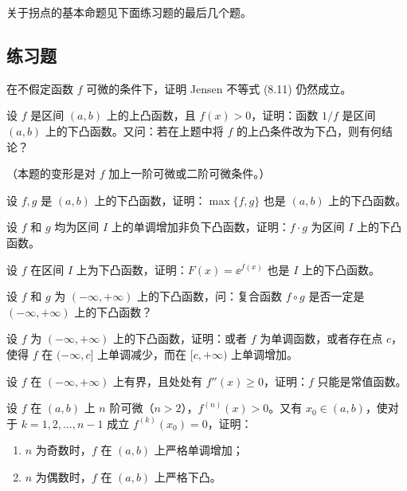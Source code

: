 关于拐点的基本命题见下面练习题的最后几个题。

\subsection{练习题}

\begin{xexercise}[1]
在不假定函数 $f$ 可微的条件下，证明 Jensen 不等式 (8.11) 仍然成立。
\end{xexercise}

\begin{xexercise}[2]
设 $f$ 是区间 $(a,b)$ 上的上凸函数，且 $f(x)>0$，证明：函数 $1/f$ 是区间 $(a,b)$ 上的下凸函数。又问：若在上题中将 $f$ 的上凸条件改为下凸，则有何结论？

  （本题的变形是对 $f$ 加上一阶可微或二阶可微条件。）
\end{xexercise}

\begin{xexercise}[3]
设 $f,g$ 是 $(a,b)$ 上的下凸函数，证明：$\max\{f,g\}$ 也是 $(a,b)$ 上的下凸函数。
\end{xexercise}

\begin{xexercise}[4]
设 $f$ 和 $g$ 均为区间 $I$ 上的单调增加非负下凸函数，证明：$f\cdot g$ 为区间 $I$ 上的下凸函数。
\end{xexercise}

\begin{xexercise}[5]
设 $f$ 在区间 $I$ 上为下凸函数，证明：$F(x)=\ee^{f(x)}$ 也是 $I$ 上的下凸函数。
\end{xexercise}

\begin{xexercise}[6]
设 $f$ 和 $g$ 为 $(-\infty,+\infty)$ 上的下凸函数，问：复合函数 $f\circ g$ 是否一定是 $(-\infty,+\infty)$ 上的下凸函数？
\end{xexercise}

\begin{xexercise}[7]
设 $f$ 为 $(-\infty,+\infty)$ 上的下凸函数，证明：或者 $f$ 为单调函数，或者存在点 $c$，使得 $f$ 在 $(-\infty,c]$ 上单调减少，而在 $[c,+\infty)$ 上单调增加。
\end{xexercise}

\begin{xexercise}[8]
设 $f$ 在 $(-\infty,+\infty)$ 上有界，且处处有 $f''(x)\ge0$，证明：$f$ 只能是常值函数。
\end{xexercise}

\begin{xexercise}[9]
设 $f$ 在 $(a,b)$ 上 $n$ 阶可微（$n>2$），$f^{(n)}(x)>0$。又有 $x_0\in(a,b)$，使对于 $k=1,2,\ldots,n-1$ 成立 $f^{(k)}(x_0)=0$，证明：
  \begin{enumerate}[label=(\arabic*)]
    \item $n$ 为奇数时，$f$ 在 $(a,b)$ 上严格单调增加；
    \item $n$ 为偶数时，$f$ 在 $(a,b)$ 上严格下凸。
  \end{enumerate}
\end{xexercise}

